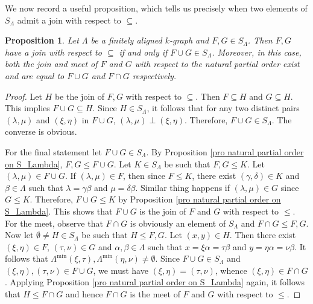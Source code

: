 \documentclass[a4paper,reqno,11pt]{amsart}
\numberwithin{equation}{section}
\newtheorem{prop}[thm]{Proposition}
\theoremstyle{definition}
\theoremstyle{remark}
\begin{document}
We now record a useful proposition, which tells us precisely when two elements of $S_\Lambda$ admit a join with respect to $\subseteq$.   
\begin{prop}\label{pro natural partial order and set-inclusion}
Let $\Lambda$ be a finitely aligned $k$-graph and $F,G\in S_\Lambda$. Then $F,G$ have a join with respect to $\subseteq$ if and only if $F\cup G\in S_\Lambda$. Moreover, in this case, both the join and meet of $F$ and $G$ with respect to the natural partial order exist and are equal to $F\cup G$ and $F\cap G$ respectively.
\end{prop}
\begin{proof}
Let $H$ be the join of $F,G$ with respect to $\subseteq$. Then $F\subseteq H$ and $G\subseteq H$. This implies $F\cup G\subseteq H$. Since $H\in S_\Lambda$, it follows that for any two distinct pairs $(\lambda,\mu)$ and $(\xi,\eta)$ in $F\cup G$, $(\lambda,\mu)\perp (\xi,\eta)$. Therefore, $F\cup G\in S_\Lambda$. The converse is obvious. 

For the final statement let $F\cup G\in S_\Lambda$. By Proposition \ref{pro natural partial order on S_Lambda}, $F,G\le F\cup G$. Let $K\in S_\Lambda$ be such that $F,G\le K$. Let $(\lambda,\mu)\in F\cup G$. If $(\lambda,\mu)\in F$, then since $F\le K$, there exist $(\gamma,\delta)\in K$ and $\beta\in \Lambda$ such that $\lambda=\gamma\beta$ and $\mu=\delta\beta$. Similar thing happens if $(\lambda,\mu)\in G$ since $G\le K$. Therefore, $F\cup G\le K$ by Proposition \ref{pro natural partial order on S_Lambda}. This shows that $F\cup G$ is the join of $F$ and $G$ with respect to $\le$. For the meet, observe that $F\cap G$ is obviously an element of $S_\Lambda$ and $F\cap G\le F,G$. Now let $\emptyset\neq H\in S_\Lambda$ be such that $H\le F,G$. Let $(x,y)\in H$. Then there exist $(\xi,\eta)\in F$, $(\tau,\nu)\in G$ and $\alpha,\beta\in \Lambda$ such that $x=\xi\alpha=\tau\beta$ and $y=\eta\alpha=\nu\beta$. It follows that $\Lambda^{\min}(\xi,\tau),\Lambda^{\min}(\eta,\nu)\neq \emptyset$. Since $F\cup G\in S_\Lambda$ and $(\xi,\eta),(\tau,\nu)\in F\cup G$, we must have $(\xi,\eta)=(\tau,\nu)$, whence $(\xi,\eta)\in F\cap G$. Applying Proposition \ref{pro natural partial order on S_Lambda} again, it follows that $H\le F\cap G$ and hence $F\cap G$ is the meet of $F$ and $G$ with respect to $\le$.   
\end{proof}
\end{document}
